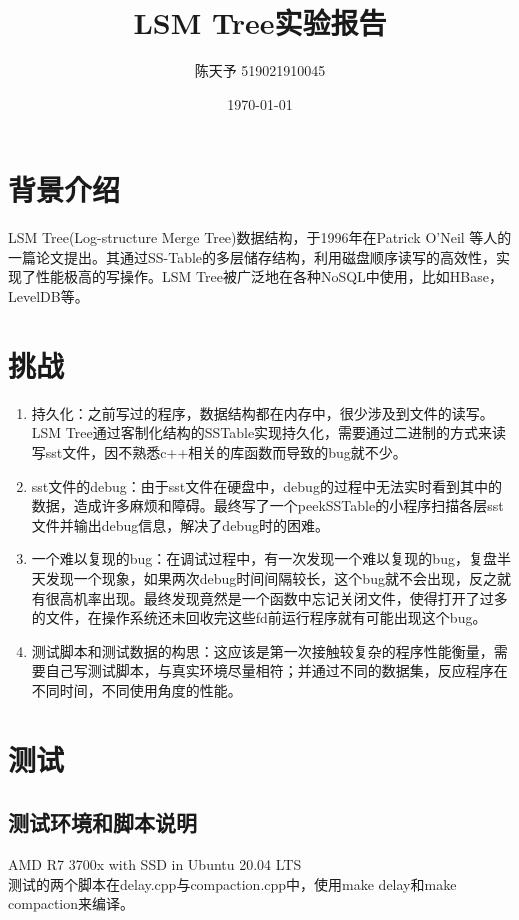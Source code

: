 \documentclass{ctexart}
\title{LSM Tree实验报告}
\author{陈天予 519021910045}
\date{\today}
\begin{document}
\maketitle

\section{背景介绍}
LSM Tree(Log-structure Merge Tree)数据结构，于1996年在Patrick O’Neil 等人的一篇论文提出。其通过SS-Table的多层储存结构，利用磁盘顺序读写的高效性，实现了性能极高的写操作。LSM Tree被广泛地在各种NoSQL中使用，比如HBase，LevelDB等。

\section{挑战}
\begin{enumerate}
  \item 持久化：之前写过的程序，数据结构都在内存中，很少涉及到文件的读写。LSM Tree通过客制化结构的SSTable实现持久化，需要通过二进制的方式来读写sst文件，因不熟悉c++相关的库函数而导致的bug就不少。
  \item sst文件的debug：由于sst文件在硬盘中，debug的过程中无法实时看到其中的数据，造成许多麻烦和障碍。最终写了一个peekSSTable的小程序扫描各层sst文件并输出debug信息，解决了debug时的困难。
  \item 一个难以复现的bug：在调试过程中，有一次发现一个难以复现的bug，复盘半天发现一个现象，如果两次debug时间间隔较长，这个bug就不会出现，反之就有很高机率出现。最终发现竟然是一个函数中忘记关闭文件，使得打开了过多的文件，在操作系统还未回收完这些fd前运行程序就有可能出现这个bug。
  \item 测试脚本和测试数据的构思：这应该是第一次接触较复杂的程序性能衡量，需要自己写测试脚本，与真实环境尽量相符；并通过不同的数据集，反应程序在不同时间，不同使用角度的性能。
\end{enumerate}

\section{测试}

\subsection{测试环境和脚本说明}
AMD R7 3700x with SSD in Ubuntu 20.04 LTS\\
测试的两个脚本在delay.cpp与compaction.cpp中，使用make delay和make compaction来编译。
\end{document}

